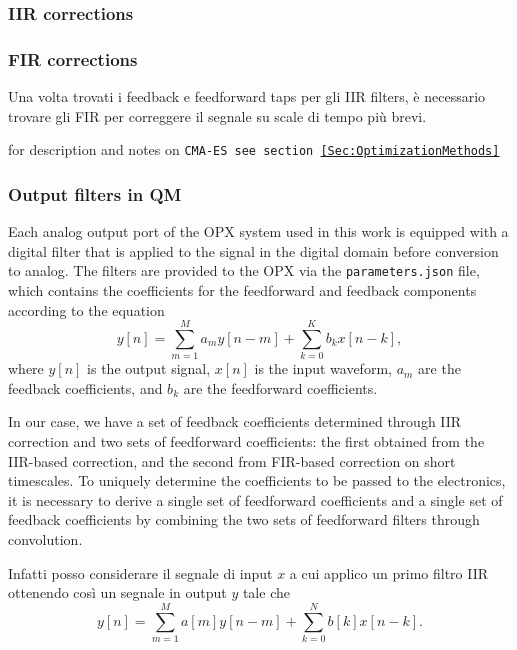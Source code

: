 \subsubsection{IIR corrections}
\subsubsection{FIR corrections}
Una volta trovati i feedback e feedforward taps per gli IIR filters, è necessario trovare gli FIR per correggere il segnale su scale di tempo più brevi. 

for description and notes on \tt{CMA-ES} see section \ref{Sec:OptimizationMethods}

\subsubsection{Output filters in QM}

Each analog output port of the OPX system used in this work is equipped with a digital filter that is applied to the signal in the digital domain before conversion to analog. The filters are provided to the OPX via the \texttt{parameters.json} file, which contains the coefficients for the feedforward and feedback components according to the equation
\begin{equation}\label{eq:OPX_filter}
    y[n] = \sum_{m=1}^{M} a_m y[n - m] + \sum_{k=0}^{K} b_k x[n - k],
\end{equation}
where $y[n]$ is the output signal, $x[n]$ is the input waveform, $a_m$ are the feedback coefficients, and $b_k$ are the feedforward coefficients.

In our case, we have a set of feedback coefficients determined through IIR correction and two sets of feedforward coefficients: the first obtained from the IIR-based correction, and the second from FIR-based correction on short timescales. 
To uniquely determine the coefficients to be passed to the electronics, it is necessary to derive a single set of feedforward coefficients and a single set of feedback coefficients by combining the two sets of feedforward filters through convolution.

Infatti posso considerare il segnale di input $x$ a cui applico un primo filtro IIR ottenendo così un segnale in output $y$ tale che
\begin{equation}\label{eq:y_signal}
    y[n] = \sum_{m=1}^{M} a[m]y[n-m] + \sum_{k=0}^{N} b[k] x[n-k].
\end{equation}

